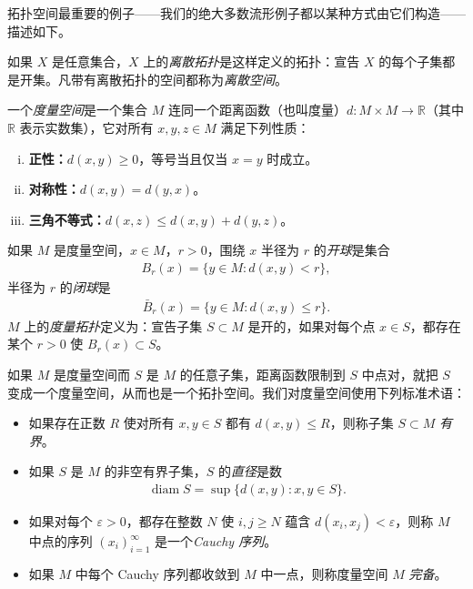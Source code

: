 \documentclass[../../main.tex]{subfiles}
\begin{document}
拓扑空间最重要的例子——我们的绝大多数流形例子都以某种方式由它们构造——描述如下。

\begin{example}[离散空间]\label{example:appA-discrete-spaces}
如果 $X$ 是任意集合，$X$ 上的\emph{离散拓扑}是这样定义的拓扑：宣告 $X$ 的每个子集都是开集。凡带有离散拓扑的空间都称为\emph{离散空间}。
\end{example}

\begin{example}[度量空间]\label{example:appA-metric-spaces}
一个\emph{度量空间}是一个集合 $M$ 连同一个距离函数（也叫度量）$d:M\times M\to\mathbb R$（其中 $\mathbb R$ 表示实数集），它对所有 $x,y,z\in M$ 满足下列性质：
\begin{enumerate}[(i)]
\item \textbf{正性：}$d(x,y)\geqslant0$，等号当且仅当 $x=y$ 时成立。
\item \textbf{对称性：}$d(x,y)=d(y,x)$。
\item \textbf{三角不等式：}$d(x,z)\leqslant d(x,y)+d(y,z)$。
\end{enumerate}
如果 $M$ 是度量空间，$x\in M$，$r>0$，围绕 $x$ 半径为 $r$ 的\emph{开球}是集合
\begin{align*}
B_r(x)=\{y\in M:d(x,y)<r\},
\end{align*}
半径为 $r$ 的\emph{闭球}是
\begin{align*}
\bar B_r(x)=\{y\in M:d(x,y)\leqslant r\}.
\end{align*}
$M$ 上的\emph{度量拓扑}定义为：宣告子集 $S\subset M$ 是开的，如果对每个点 $x\in S$，都存在某个 $r>0$ 使 $B_r(x)\subset S$。
\end{example}

如果 $M$ 是度量空间而 $S$ 是 $M$ 的任意子集，距离函数限制到 $S$ 中点对，就把 $S$ 变成一个度量空间，从而也是一个拓扑空间。我们对度量空间使用下列标准术语：
\begin{itemize}
\item 如果存在正数 $R$ 使对所有 $x,y\in S$ 都有 $d(x,y)\leqslant R$，则称子集 $S\subset M$ \emph{有界}。
\item 如果 $S$ 是 $M$ 的非空有界子集，$S$ 的\emph{直径}是数
\begin{align*}
\operatorname{diam}S=\sup\{d(x,y):x,y\in S\}.
\end{align*}
\item 如果对每个 $\varepsilon>0$，都存在整数 $N$ 使 $i,j\geqslant N$ 蕴含 $d(x_i,x_j)<\varepsilon$，则称 $M$ 中点的序列 $(x_i)_{i=1}^\infty$ 是一个\emph{Cauchy 序列}。
\item 如果 $M$ 中每个 Cauchy 序列都收敛到 $M$ 中一点，则称度量空间 $M$ \emph{完备}。
\end{itemize}
\end{document}
